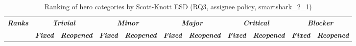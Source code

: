 \begin{table}[htbp]
    \centering
    \scriptsize
    \caption{Ranking of hero categories by Scott-Knott ESD (RQ3, assignee policy, smartshark\_2\_1)}
    \label{tab:rq3-herorank-assignee}
    \begin{adjustbox}{max width=\textwidth}
        \begin{tabular}{|c|cc|cc|cc|cc|cc|}
            \hline
            \multirow{2}{*}{\textit{\textbf{Ranks}}} & \multicolumn{2}{c|}{\textit{\textbf{Trivial}}} & \multicolumn{2}{c|}{\textit{\textbf{Minor}}} & \multicolumn{2}{c|}{\textit{\textbf{Major}}} & \multicolumn{2}{c|}{\textit{\textbf{Critical}}} & \multicolumn{2}{c|}{\textit{\textbf{Blocker}}} \\ \cline{2-11}
            & \multicolumn{1}{c|}{\textit{\textbf{Fixed}}} & \textit{\textbf{Reopened}} & \multicolumn{1}{c|}{\textit{\textbf{Fixed}}} & \textit{\textbf{Reopened}} & \multicolumn{1}{c|}{\textit{\textbf{Fixed}}} & \textit{\textbf{Reopened}} & \multicolumn{1}{c|}{\textit{\textbf{Fixed}}} & \textit{\textbf{Reopened}} & \multicolumn{1}{c|}{\textit{\textbf{Fixed}}} & \textit{\textbf{Reopened}} \\ \hline

\end{tabular}
\end{adjustbox}
\end{table}
